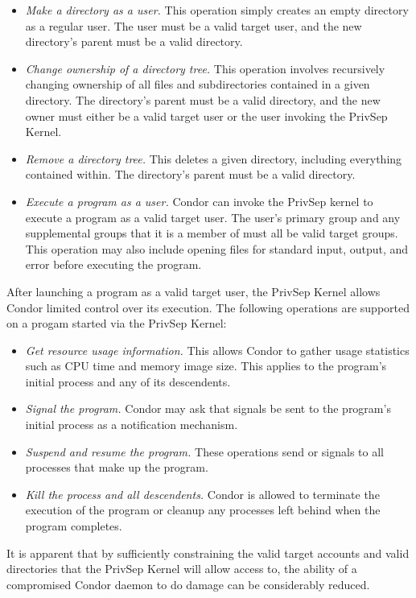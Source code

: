 \begin{itemize}

\item \emph{Make a directory as a user.} This operation simply creates
an empty directory as a regular user. The user must be a valid target
user, and the new directory's parent must be a valid directory.

\item \emph{Change ownership of a directory tree.} This operation
involves recursively changing ownership of all files and
subdirectories contained in a given directory. The directory's parent
must be a valid directory, and the new owner must either be a valid
target user or the user invoking the PrivSep Kernel.

\item \emph{Remove a directory tree.} This deletes a given directory,
including everything contained within. The directory's parent must be
a valid directory.

\item \emph{Execute a program as a user.} Condor can invoke the
PrivSep kernel to execute a program as a valid target user. The user's
primary group and any supplemental groups that it is a member of must
all be valid target groups. This operation may also include opening
files for standard input, output, and error before executing the
program.

\end{itemize}

After launching a program as a valid target user, the PrivSep Kernel
allows Condor limited control over its execution. The following
operations are supported on a progam started via the PrivSep Kernel:

\begin{itemize}

\item \emph{Get resource usage information.} This allows Condor to
gather usage statistics such as CPU time and memory image size. This
applies to the program's initial process and any of its descendents.

\item \emph{Signal the program.} Condor may ask that signals be sent
to the program's initial process as a notification mechanism.

\item \emph{Suspend and resume the program.} These operations send
 or  signals to all processes that make up
the program.

\item \emph{Kill the process and all descendents.} Condor is allowed
to terminate the execution of the program or cleanup any processes
left behind when the program completes.

\end{itemize}

It is apparent that by sufficiently constraining the valid target
accounts and valid directories that the PrivSep Kernel will allow
access to, the ability of a compromised Condor daemon to do damage can
be considerably reduced.

